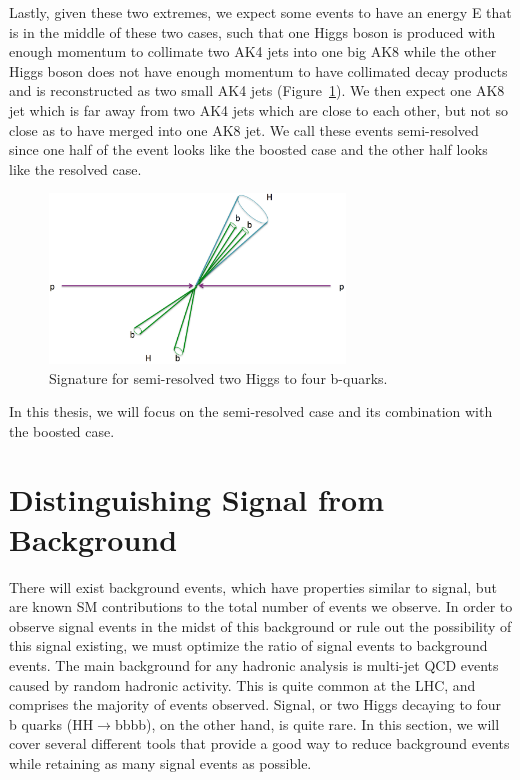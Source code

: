 Lastly, given these two extremes, we expect some events to have an energy E that is in the middle of these two cases, such that one Higgs boson is produced with enough momentum to collimate two AK4 jets into one big AK8 while the other Higgs boson does not have enough momentum to have collimated decay products and is reconstructed as two small AK4 jets (Figure~\ref{Fig:threecases3}). We then expect one AK8 jet which is far away from two AK4 jets which are close to each other, but not so close as to have merged into one AK8 jet. We call these events semi-resolved since one half of the event looks like the boosted case and the other half looks like the resolved case. 
\begin{figure}[h!]
    \centering
        \includegraphics[width=0.7\textwidth]{F4/semiresolved.png}
        \caption{Signature for semi-resolved two Higgs to four b-quarks.}
        \label{Fig:threecases3}
\end{figure}
In this thesis, we will focus on the semi-resolved case and its combination with the boosted case.
\vspace{5mm}

\section{Distinguishing Signal from Background}

There will exist background events, which have properties similar to signal, but are known SM contributions to the total number of events we observe. In order to observe signal events in the midst of this background or rule out the possibility of this signal existing, we must optimize the ratio of signal events to background events. The main background for any hadronic analysis is multi-jet QCD events caused by random hadronic activity. This is quite common at the LHC, and comprises the majority of events observed. Signal, or two Higgs decaying to four b quarks (HH$\rightarrow$bbbb), on the other hand, is quite rare. In this section, we will cover several different tools that provide a good way to reduce background events while retaining as many signal events as possible.


